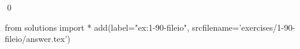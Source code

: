 
\begin{ex}
  \label{ex:1-90-fileio}
  
  \qed
\end{ex}
\begin{python0}
from solutions import *
add(label="ex:1-90-fileio",
    srcfilename='exercises/1-90-fileio/answer.tex')
\end{python0}
